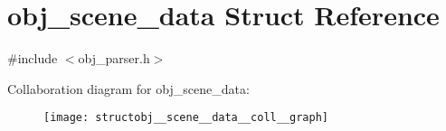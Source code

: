 \hypertarget{structobj__scene__data}{\section{obj\+\_\+scene\+\_\+data Struct Reference}
\label{structobj__scene__data}
}


{\ttfamily \#include $<$obj\+\_\+parser.\+h$>$}



Collaboration diagram for obj\+\_\+scene\+\_\+data\+:\nopagebreak
\begin{figure}[H]
\begin{center}
\leavevmode
\texttt{[image: structobj\_\_scene\_\_data\_\_coll\_\_graph]}
\end{center}
\end{figure}
